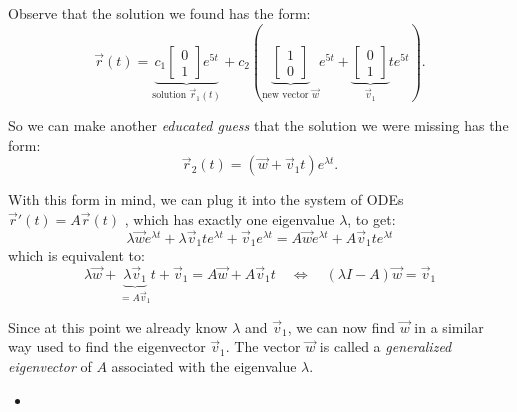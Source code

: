 \begin{graybox}
Observe that the solution we found has the form:
$$
	\vec{r}(t) = \underbrace{c_1 \begin{bmatrix} 0 \\ 1 \end{bmatrix} e^{5t}}_{\text{solution } \vec{r}_1(t)} + c_2 \left( 
	\underbrace{\begin{bmatrix}	1 \\ 0 \end{bmatrix}}_{\text{new vector } \vec{w}} e^{5t} + \underbrace{\begin{bmatrix} 0  \\ 1 
	\end{bmatrix}}_{\vec{v}_1} t e^{5t}\right).
$$

So we can make another \emph{educated guess} that the solution we were missing has the form:
$$
\vec{r}_2(t) = \left(\vec{w} + \vec{v}_1 t\right) e^{\lambda t}.
$$

With this form in mind, we can plug it into the system of ODEs \quad $\vec{r}'(t) = A \vec{r}(t)$ \quad, which has exactly one eigenvalue $\lambda$, to get:
$$
\lambda \vec{w}e^{\lambda t} + \lambda \vec{v}_1 t e^{\lambda t} + \vec{v}_1 e^{\lambda t}
= A \vec{w} e^{\lambda t} + A \vec{v}_1 t  e^{\lambda t}
$$
which is equivalent to:
$$
\lambda \vec{w} + \underbrace{\lambda \vec{v}_1}_{=A \vec{v}_1} t  + \vec{v}_1
= A \vec{w}  + A \vec{v}_1 t 
	\quad \Leftrightarrow \quad
	\left( \lambda I - A \right ) \vec{w} = \vec{v}_1
$$

Since at this point we already know $\lambda$ and $\vec{v}_1$, we can now find $\vec{w}$ in a similar way used to find the eigenvector $\vec{v}_1$. The vector $\vec{w}$ is called a \emph{generalized eigenvector} of $A$ associated with the eigenvalue $\lambda$.

\end{graybox}

\begin{video}
	\begin{itemize}
		\item {}
	\end{itemize}
\end{video}





